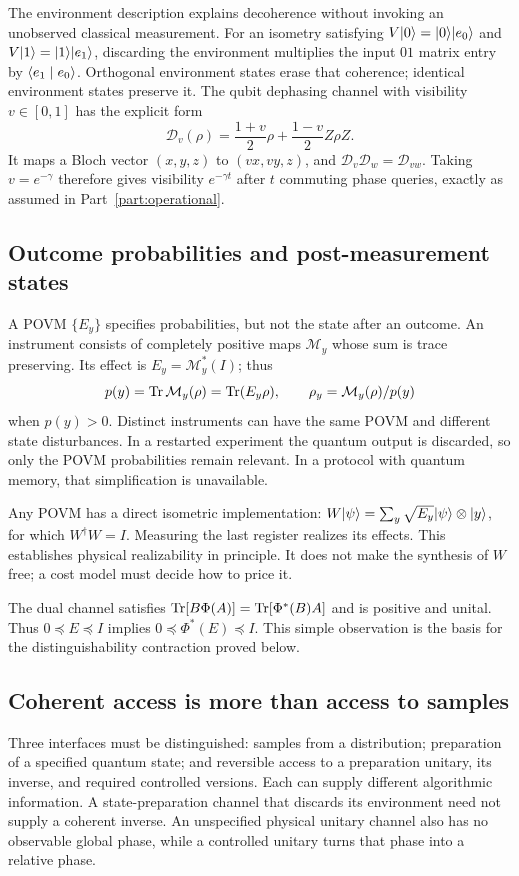 The environment description explains decoherence without invoking an
unobserved classical measurement. For an isometry satisfying
$V\lvert 0\rangle=\lvert 0\rangle\lvert e_0\rangle$ and $V\lvert 1\rangle=\lvert 1\rangle\lvert e_1\rangle$,
discarding the environment multiplies the input $01$ matrix entry by
$\langle e_1\mid e_0\rangle$. Orthogonal environment states erase that coherence;
identical environment states preserve it. The qubit dephasing channel
with visibility $v\in[0,1]$ has the explicit form
\begin{equation}\label{eq:dephasing-foundations}
 \mathcal D_v(\rho)=\frac{1+v}{2}\rho+
                   \frac{1-v}{2}Z\rho Z.
\end{equation}
It maps a Bloch vector $(x,y,z)$ to $(vx,vy,z)$, and
$\mathcal D_v\mathcal D_w=\mathcal D_{vw}$. Taking $v=e^{-\gamma}$
therefore gives visibility $e^{-\gamma t}$ after $t$ commuting phase
queries, exactly as assumed in Part~\ref{part:operational}.

\subsection{Outcome probabilities and post-measurement states}
A POVM $\{E_y\}$ specifies probabilities, but not the state after an
outcome. An instrument consists of completely positive maps
$\mathcal M_y$ whose sum is trace preserving. Its effect is
$E_y=\mathcal M_y^*(I)$; thus
\[
 p(y)=\operatorname{Tr}\mathcal M_y(\rho)=\operatorname{Tr}(E_y\rho),\qquad
 \rho_y=\mathcal M_y(\rho)/p(y)
\]
when $p(y)>0$. Distinct instruments can have the same POVM and different
state disturbances. In a restarted experiment the quantum output is
discarded, so only the POVM probabilities remain relevant. In a protocol
with quantum memory, that simplification is unavailable.

Any POVM has a direct isometric implementation:
$W\lvert \psi\rangle=\sum_y\sqrt{E_y}\lvert \psi\rangle\otimes\lvert y\rangle$, for which
$W^\dagger W=I$. Measuring the last register realizes its effects.
This establishes physical realizability in principle. It does not make
the synthesis of $W$ free; a cost model must decide how to price it.

The dual channel satisfies
$\operatorname{Tr}[B\Phi(A)]=\operatorname{Tr}[\Phi^*(B)A]$ and is positive and unital.
Thus $0\preceq E\preceq I$ implies
$0\preceq\Phi^*(E)\preceq I$. This simple observation is the basis
for the distinguishability contraction proved below.

\subsection{Coherent access is more than access to samples}
Three interfaces must be distinguished: samples from a distribution;
preparation of a specified quantum state; and reversible access to a
preparation unitary, its inverse, and required controlled versions.
Each can supply different algorithmic information. A state-preparation
channel that discards its environment need not supply a coherent inverse.
An unspecified physical unitary channel also has no observable global
phase, while a controlled unitary turns that phase into a relative phase.

